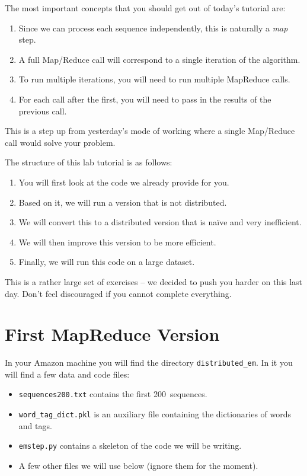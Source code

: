 The most important concepts that you should get out of today's tutorial are:

\begin{enumerate}
\item Since we can process each sequence independently, this is naturally a
\emph{map} step.
\item A full Map/Reduce call will correspond to a single iteration of the
algorithm.
\item To run multiple iterations, you will need to run multiple MapReduce
calls.
\item For each call after the first, you will need to pass in the results of
the previous call.
\end{enumerate}

This is a step up from yesterday's mode of working where a single Map/Reduce
call would solve your problem.

The structure of this lab tutorial is as follows:

\begin{enumerate}
\item You will first look at the code we already provide for you.
\item Based on it, we will run a version that is not distributed.
\item We will convert this to a distributed version that is na\"{i}ve and very inefficient.
\item We will then improve this version to be more efficient.
\item Finally, we will run this code on a large dataset.
\end{enumerate}

This is a rather large set of exercises -- we decided to push you harder on this last day. Don't feel discouraged if you cannot complete everything.

\section{First MapReduce Version}

In your Amazon machine you will find the directory \texttt{distributed\_em}. In
it you will find a few data and code files:

\begin{itemize}
\item \verb+sequences200.txt+ contains the first 200~sequences.
\item \verb+word_tag_dict.pkl+ is an auxiliary file containing the dictionaries of words and tags.
\item \verb+emstep.py+ contains a skeleton of the code we will be writing.
\item A few other files we will use below (ignore them for the moment).
\end{itemize}

